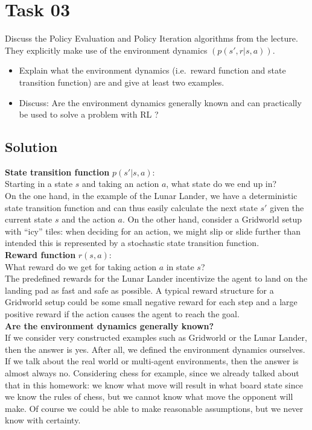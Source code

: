 \documentclass{article}
\begin{document}
\section{Task 03}
Discuss the Policy Evaluation and Policy Iteration algorithms from the lecture.
They explicitly make use of the environment dynamics $(p(s', r | s, a))$.
\begin{itemize}
    \item Explain what the environment dynamics (i.e.\ reward function and
    state transition function) are and give at least two examples.
    \item Discuss: Are the environment dynamics generally known and can practically
    be used to solve a problem with RL \@?
\end{itemize}
\subsection{Solution}
\textbf{State transition function} $p(s' | s, a)$: \\
Starting in a state $s$ and taking an action $a$, what state do we end up in? \\
On the one hand, in the example of the Lunar Lander, we have a deterministic state transition function
and can thus easily calculate the next state $s'$ given the current state $s$ and the action $a$. 
On the other hand, consider a Gridworld setup with ``icy'' tiles: when deciding for an action, we might
slip or slide further than intended \textemdash{} this is represented by a stochastic state transition function. \\

\textbf{Reward function} $r(s, a)$: \\
What reward do we get for taking action $a$ in state $s$? \\
The predefined rewards for the Lunar Lander incentivize the agent to land on the landing pad as fast 
and safe as possible. A typical reward structure for a Gridworld setup could be some small negative reward
for each step and a large positive reward if the action causes the agent to reach the goal. \\

\textbf{Are the environment dynamics generally known?} \\
If we consider very constructed examples such as Gridworld or the Lunar Lander, then the answer is yes.
After all, we defined the environment dynamics ourselves. If we talk about the real world or
multi-agent environments, then the answer is almost always no. 
Considering chess for example, since we already talked about
that in this homework: we know what move will result in what board state since we know the
rules of chess, but we cannot know what move the opponent will make. Of course we could be able to make 
reasonable assumptions, but we never know with certainty. \\




\end{document}
